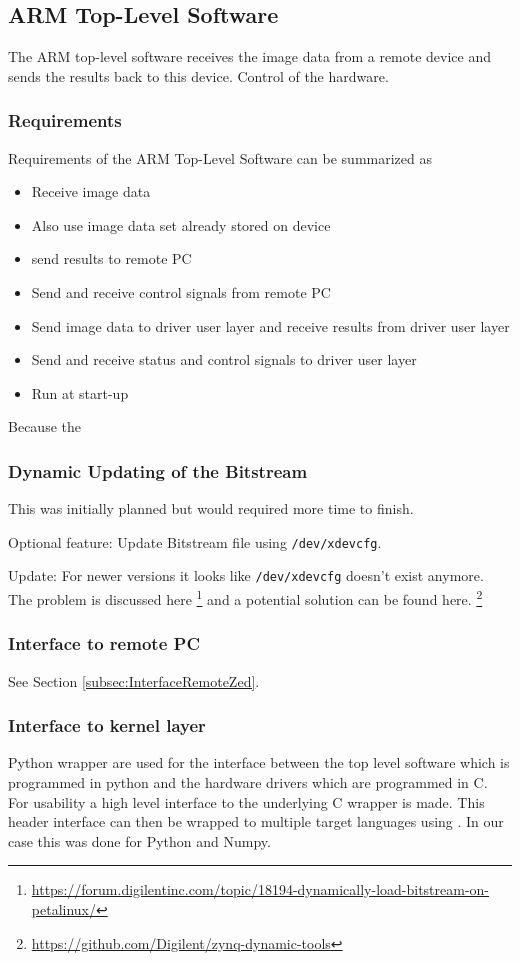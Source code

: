 \subsection{ARM Top-Level Software}
The ARM top-level software receives the image data from a remote device and sends the results back to this device. Control of the hardware.

\subsubsection{Requirements}

Requirements of the ARM Top-Level Software can be summarized as
\begin{itemize} 
	\item Receive image data
	\item Also use image data set already stored on device
	\item send results to remote PC
	\item Send and receive control signals from remote PC
	\item Send image data to driver user layer and receive results from driver user layer
	\item Send and receive status and control signals to driver user layer
	\item Run at start-up 
\end{itemize}

Because the 

\subsubsection{Dynamic Updating of the Bitstream}

This was initially planned but would required more time to finish.

Optional feature: Update Bitstream file using \texttt{/dev/xdevcfg}.

Update: For newer versions it looks like \texttt{/dev/xdevcfg} doesn't exist anymore. The problem is discussed here \footnote{\url{https://forum.digilentinc.com/topic/18194-dynamically-load-bitstream-on-petalinux/}} and a potential solution can be found here. \footnote{\url{https://github.com/Digilent/zynq-dynamic-tools}}

\subsubsection{Interface to remote PC}
See Section \ref{subsec:InterfaceRemoteZed}.  
\subsubsection{Interface to kernel layer}
Python wrapper are used for the interface between the top level software which is programmed in python and the hardware drivers which are programmed in C. For usability a high level interface to the underlying C wrapper is made. 
This header interface can then be wrapped to multiple target languages using \cite{Beazley:1996aa}. In our case this was done for Python and Numpy. 

